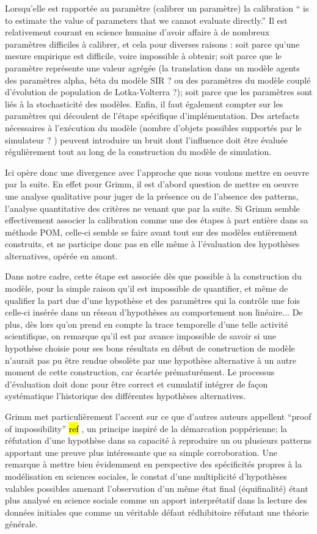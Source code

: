 Lorsqu'elle est rapportée au paramètre (calibrer un paramètre) la calibration \enquote{ is to estimate the value of parameters that we cannot evaluate directly.} Il est relativement courant en science humaine d'avoir affaire à de nombreux paramètres difficiles à calibrer, et cela pour diverses raisons : soit parce qu'une mesure empirique est difficile, voire impossible à obtenir; soit parce que le paramètre représente une valeur agrégée (la translation dans un modèle agents des paramètres alpha, béta du modèle SIR ? ou des paramètres du modèle couplé d'évolution de population de Lotka-Volterra ?); soit parce que les paramètres sont liés à la stochasticité des modèles. Enfin, il faut également compter sur les paramètres qui découlent de l'étape spécifique d'implémentation. Des artefacts nécessaires à l'exécution du modèle (nombre d'objets possibles supportés par le simulateur ? ) peuvent introduire un bruit dont l'influence doit être évaluée régulièrement tout au long de la construction du modèle de simulation.

Ici opère donc une divergence avec l'approche que nous voulons mettre en oeuvre par la suite. En effet pour Grimm, il est d'abord question de mettre en oeuvre une analyse qualitative pour juger de la présence ou de l'absence des patterns, l'analyse quantitative des critères ne venant que par la suite. Si Grimm semble effectivement associer la calibration comme une des étapes à part entière dans sa méthode POM, celle-ci semble se faire avant tout sur des modèles entièrement construits, et ne participe donc pas en elle même à l'évaluation des hypothèses alternatives, opérée en amont. %

Dans notre cadre, cette étape est associée dès que possible à la construction du modèle, pour la simple raison qu'il est impossible de quantifier, et même de qualifier la part due d'une hypothèse et des paramètres qui la contrôle une fois celle-ci insérée dans un réseau d'hypothèses au comportement non linéaire... De plus, dès lors qu'on prend en compte la trace temporelle d'une telle activité scientifique, on remarque qu'il est par avance impossible de savoir si une hypothèse choisie pour ses bons résultats en début de construction de modèle n'aurait pas pu être rendue obsolète par une hypothèse alternative à un autre moment de cette construction, car écartée prématurément. Le processus d'évaluation doit donc pour être correct et cumulatif intégrer de façon systématique l'historique des différentes hypothèses alternatives.

Grimm met particulièrement l'accent sur ce que d'autres auteurs appellent \enquote{proof of impossibility} \hl{ref }, un principe inspiré de la démarcation poppérienne; la réfutation d'une hypothèse dans sa capacité à reproduire un ou plusieurs patterns apportant une preuve plus intéressante que sa simple corroboration. Une remarque à mettre bien évidemment en perspective des spécificités propres à la modélisation en sciences sociales, le constat d'une multiplicité d'hypothèses valables possibles amenant l'observation d'un même état final (équifinalité) étant plus analysé en science sociale comme un apport interprétatif dans la lecture des données initiales que comme un véritable défaut rédhibitoire réfutant une théorie générale. 

